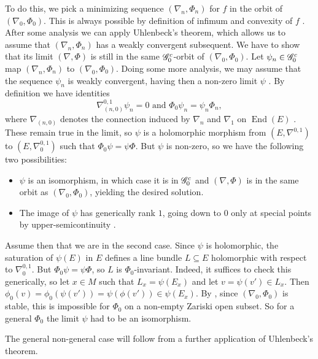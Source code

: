 \documentclass[A4paper, 12pt, british, reqno]{amsart}
\DeclareMathOperator{\End}{End}
\newcommand{\1}{\mathbbm{1}}
\begin{document}
To do this, we pick a minimizing sequence $(\nabla_{n},\Phi_{n})$ for $f$ in the orbit of $(\nabla_{0},\Phi_{0})$.
This is always possible by definition of infimum and convexity of $f$ \cite[\S 8]{ab83}.
After some analysis we can apply Uhlenbeck's theorem, which allows us to assume that $(\nabla_{n},\Phi_{n})$ has a weakly convergent subsequent.
We have to show that its limit $(\nabla,\Phi)$ is still in the same $\mathscr{G}^{c}_{0}$-orbit of $(\nabla_{0},\Phi_{0})$.
Let $\psi_{n}\in \mathscr{G}^{c}_{0}$ map $(\nabla_{n},\Phi_{n})$ to $(\nabla_{0},\Phi_{0})$.
Doing some more analysis, we may assume that the sequence $\psi_{n}$ is weakly convergent, having then a non-zero limit $\psi$ \cite[p.~82]{hit87a}.
By definition we have identities
\[ \nabla_{(n,0)}^{0,1}\psi_{n}=0 \text{ and } \Phi_{0}\psi_{n}=\psi_{n}\Phi_{n}, \]
where $\nabla_{(n,0)}$ denotes the connection induced by $\nabla_{n}$ and $\nabla_{1}$ on $\End(E)$ \cite[Example 4.2.6 iii)]{huy05}.
These remain true in the limit, so $\psi$ is a holomorphic morphism from $(E,\nabla^{0,1})$ to $(E,\nabla^{0,1}_{0})$ such that $\Phi_{0}\psi=\psi\Phi$.
But $\psi$ is non-zero, so we have the following two possibilities:
\begin{itemize}
    \item $\psi$ is an isomorphism, in which case it is in $\mathscr{G}^{c}_{0}$ and $(\nabla,\Phi)$ is in the same orbit as $(\nabla_{0},\Phi_{0})$, yielding the desired solution.
    \item The image of $\psi$ has generically rank $1$, going down to $0$ only at special points by upper-semicontinuity \cite[Proposition 1.3.2]{ati89}.
\end{itemize}

Assume then that we are in the second case.
Since $\psi$ is holomorphic, the saturation of $\psi(E)$ in $E$ defines a line bundle $L\subseteq E$ holomorphic with respect to $\nabla_{0}^{0,1}$.
But $\Phi_{0}\psi=\psi\Phi$, so $L$ is $\Phi_{0}$-invariant.
Indeed, it suffices to check this generically, so let $x\in M$ such that $L_{x}=\psi(E_{x})$ and let $v=\psi(v')\in L_{x}$.
Then $\phi_{0}(v)=\phi_{0}(\psi(v'))=\psi(\phi(v'))\in \psi(E_{x})$.
By , since $(\nabla_{0},\Phi_{0})$ is stable, this is impossible for $\Phi_{0}$ on a non-empty Zariski open subset.
So for a general $\Phi_{0}$ the limit $\psi$ had to be an isomorphism.

The general non-general case will follow from a further application of Uhlenbeck's theorem.



\vfill
\end{document}
